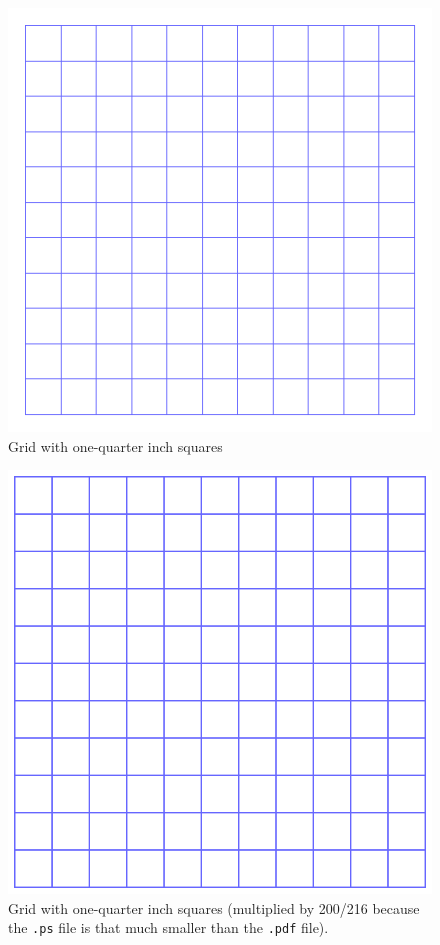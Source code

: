 \documentclass{article}
\begin{document}
\begin{figure}
\includegraphics{figtestd.pdf}
\caption{Grid with one-quarter inch squares}
\end{figure}

\begin{figure}
\includegraphics{figtestd.ps}
\caption{Grid with one-quarter inch squares (multiplied by 200/216
because the \texttt{.ps} file is that much smaller than the \texttt{.pdf}
file).}
\end{figure}
\end{document}
